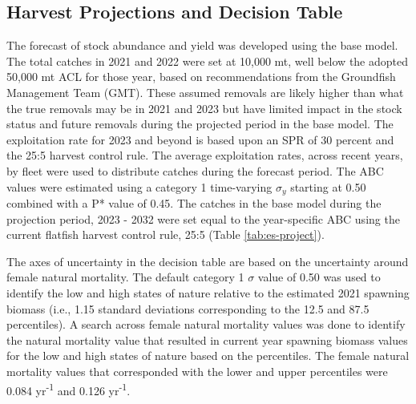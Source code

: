 \documentclass[11pt,
  english,
  a4paper,
]{article}
\begin{document}
\leavevmode\tagmcend\tagstructend\par


\hypertarget{harvest-projections-and-decision-table}{%
\subsection*{Harvest Projections and Decision Table}\label{harvest-projections-and-decision-table}}

\leavevmode\tagmcend\tagstructend


The forecast of stock abundance and yield was developed using the base model. The total catches in 2021 and 2022 were set at 10,000 mt, well below the adopted 50,000 mt ACL for those year, based on recommendations from the Groundfish Management Team (GMT). These assumed removals are likely higher than what the true removals may be in 2021 and 2023 but have limited impact in the stock status and future removals during the projected period in the base model. The exploitation rate for 2023 and beyond is based upon an SPR of 30 percent and the 25:5 harvest control rule. The average exploitation rates, across recent years, by fleet were used to distribute catches during the forecast period. The ABC values were estimated using a category 1 time-varying {\(\sigma_y\)\leavevmode\tagmcend\tagstructend} starting at 0.50 combined with a P* value of 0.45. The catches in the base model during the projection period, 2023 - 2032 were set equal to the year-specific ABC using the current flatfish harvest control rule, 25:5 (Table \ref{tab:es-project}).

\leavevmode\tagmcend\tagstructend\par


The axes of uncertainty in the decision table are based on the uncertainty around female natural mortality. The default category 1 {\(\sigma\)\leavevmode\tagmcend\tagstructend} value of 0.50 was used to identify the low and high states of nature relative to the estimated 2021 spawning biomass (i.e., 1.15 standard deviations corresponding to the 12.5 and 87.5 percentiles). A search across female natural mortality values was done to identify the natural mortality value that resulted in current year spawning biomass values for the low and high states of nature based on the percentiles. The female natural mortality values that corresponded with the lower and upper percentiles were 0.084 yr\textsuperscript{-1} and 0.126 yr\textsuperscript{-1}.
\end{document}
